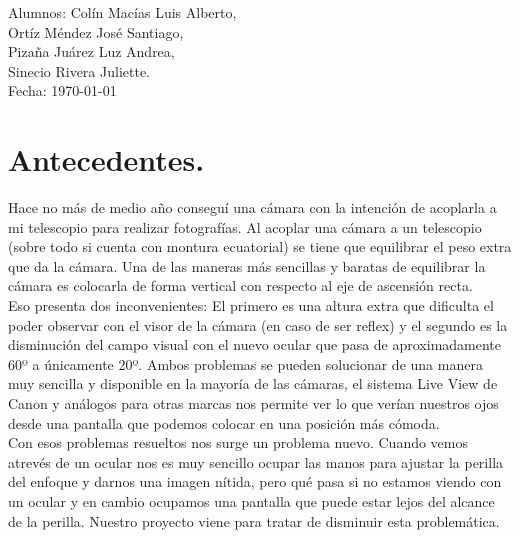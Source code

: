 \documentclass{article}
\begin{document}
\begin{titlepage}
{        \fontsize{18pt}{10pt}\selectfont
        \begin{flushright}
            Alumnos: Colín Macías Luis Alberto,\\
            Ortíz Méndez José Santiago,\\
            Pizaña Juárez Luz Andrea,\\
            Sinecio Rivera Juliette.\\
            Fecha: \today
        \end{flushright} }
        \vspace*{\fill} 
    \end{titlepage}

    \newpage

    \tableofcontents
    \newpage

    \renewcommand{\chaptername}{Parte}

    \section{Antecedentes.}
        Hace no más de medio año conseguí una cámara con la intención de acoplarla a mi telescopio para realizar fotografías. 
        Al acoplar una cámara a un telescopio (sobre todo si cuenta con montura ecuatorial) se tiene que equilibrar el peso extra que da la cámara. Una de las maneras más sencillas y baratas de equilibrar la cámara es colocarla de forma vertical con respecto al eje de ascensión recta.\\
        Eso presenta dos inconvenientes: El primero es una altura extra que dificulta el poder observar con el visor de la cámara (en caso de ser reflex) y el segundo es la disminución del campo visual con el nuevo ocular que pasa de aproximadamente 60º a únicamente 20º. Ambos problemas se pueden solucionar de una manera muy sencilla y disponible en la mayoría de las cámaras, el sistema Live View de Canon y análogos para otras marcas nos permite ver lo que verían nuestros ojos desde una pantalla que podemos colocar en una posición más cómoda.\\
        Con esos problemas resueltos nos surge un problema nuevo. Cuando vemos atrevés de un ocular nos es muy sencillo ocupar las manos para ajustar la perilla del enfoque y darnos una imagen nítida, pero qué pasa si no estamos viendo con un ocular y en cambio ocupamos una pantalla que puede estar lejos del alcance de la perilla. Nuestro proyecto viene para tratar de disminuir esta problemática.\\
    
\end{document}

